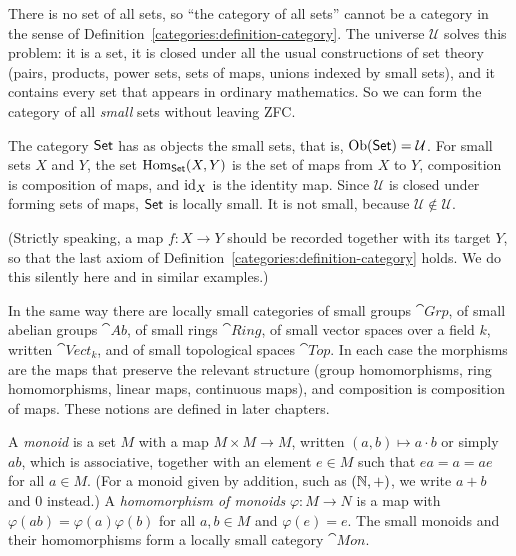 \begin{remark}\label{categories:remark-why-universes}
There is no set of all sets, so ``the category of all sets'' cannot be a
category in the sense of Definition~\ref{categories:definition-category}. The
universe $\mathcal{U}$ solves this problem: it is a set, it is closed under all
the usual constructions of set theory (pairs, products, power sets, sets of
maps, unions indexed by small sets), and it contains every set that appears in
ordinary mathematics. So we can form the category of all \emph{small} sets
without leaving ZFC.
\end{remark}

\begin{example}\label{categories:example-sets}
The category $\mathsf{Set}$ has as objects the small sets, that is,
$\operatorname{Ob}(\mathsf{Set}) = \mathcal{U}$. For small sets $X$ and $Y$, the set
$\operatorname{Hom}_{\mathsf{Set}}(X, Y)$ is the set of maps from $X$ to $Y$, composition is
composition of maps, and $\mathrm{id}_X$ is the identity map. Since $\mathcal{U}$ is
closed under forming sets of maps, $\mathsf{Set}$ is locally small. It is not small,
because $\mathcal{U} \notin \mathcal{U}$.

(Strictly speaking, a map $f \colon X \to Y$ should be recorded together with
its target $Y$, so that the last axiom of
Definition~\ref{categories:definition-category} holds. We do this silently
here and in similar examples.)
\end{example}

\begin{example}\label{categories:example-algebraic-categories}
In the same way there are locally small categories of small groups
$\cat{Grp}$, of small abelian groups $\cat{Ab}$, of small rings $\cat{Ring}$,
of small vector spaces over a field $k$, written $\cat{Vect}_k$, and of small
topological spaces $\cat{Top}$. In each case the morphisms are the maps that
preserve the relevant structure (group homomorphisms, ring homomorphisms,
linear maps, continuous maps), and composition is composition of maps. These
notions are defined in later chapters.
\end{example}

\begin{definition}\label{categories:definition-monoid}
A \emph{monoid} is a set $M$ with a map $M \times M \to M$, written
$(a, b) \mapsto a \cdot b$ or simply $ab$, which is associative, together with an element
$e \in M$ such that $ea = a = ae$ for all $a \in M$. (For a monoid given by addition, such as
$(\mathbb{N}, +)$, we write $a + b$ and $0$ instead.) A \emph{homomorphism of monoids}
$\varphi \colon M \to N$ is a map with $\varphi(ab) = \varphi(a)\varphi(b)$ for
all $a, b \in M$ and $\varphi(e) = e$. The small monoids and their
homomorphisms form a locally small category $\cat{Mon}$.
\end{definition}

